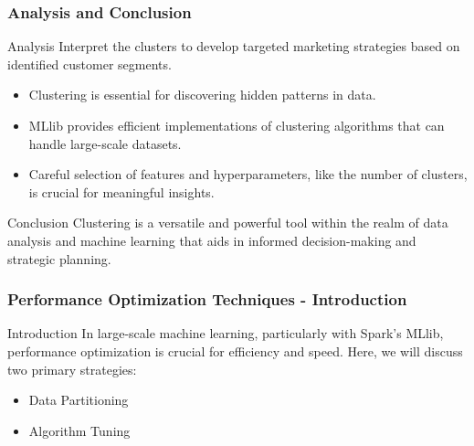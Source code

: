 \documentclass[aspectratio=169]{beamer}
\begin{document}
\begin{frame}[fragile]
    \frametitle{Analysis and Conclusion}
    \begin{block}{Analysis}
        Interpret the clusters to develop targeted marketing strategies based on identified customer segments.
    \end{block}
    \begin{itemize}
        \item Clustering is essential for discovering hidden patterns in data.
        \item MLlib provides efficient implementations of clustering algorithms that can handle large-scale datasets.
        \item Careful selection of features and hyperparameters, like the number of clusters, is crucial for meaningful insights.
    \end{itemize}
    \begin{block}{Conclusion}
        Clustering is a versatile and powerful tool within the realm of data analysis and machine learning that aids in informed decision-making and strategic planning.
    \end{block}
\end{frame}

\begin{frame}[fragile]
    \frametitle{Performance Optimization Techniques - Introduction}
    \begin{block}{Introduction}
        In large-scale machine learning, particularly with Spark's MLlib, performance optimization is crucial for efficiency and speed. 
        Here, we will discuss two primary strategies: 
        \begin{itemize}
            \item Data Partitioning
            \item Algorithm Tuning
        \end{itemize}
    \end{block}
\end{frame}
\end{document}
